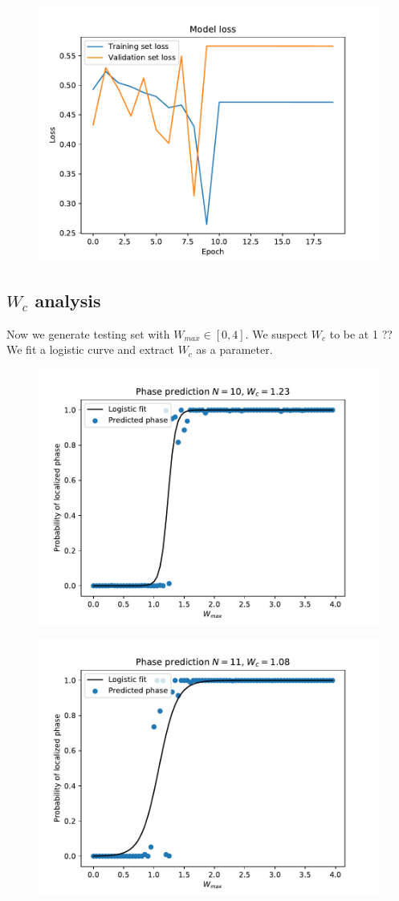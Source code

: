 \documentclass[reprint,amsmath,amssymb,aps,prb]{revtex4-2}
\begin{document}
\begin{figure}[h!]
	\centering
	\includegraphics[width=0.7\linewidth]{../results/N12_loss_epochs}
	\caption{}
	\label{fig:N12_loss_epochs}
\end{figure}

\subsection{$W_c$ analysis}


Now we generate testing set with $W_{max} \in \left[0,4\right]$. We suspect $W_c$ to be at 1 ??%
We fit a logistic curve and extract $W_c$ as a parameter.

\begin{figure}[h!]
	\centering
	\includegraphics[width=0.7\linewidth]{../results/N10_predict_wc}
	\caption{}
	\label{fig:N10_predict_wc}
\end{figure}

\begin{figure}[h!]
	\centering
	\includegraphics[width=0.7\linewidth]{../results/N11_predict_wc}
	\caption{}
	\label{fig:N11_predict_wc}
\end{figure}
\end{document}
